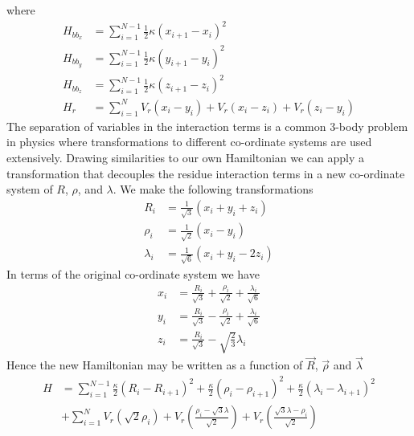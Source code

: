 %
where
%
\begin{align}
\label{col_hamiltonian_x}
H_{bb_x} &= \sum_{i=1}^{N-1} \frac{1}{2} \kappa \left(x_{i+1}-x_{i} \right)^2 \\
\label{col_hamiltonian_y}
H_{bb_y} &= \sum_{i=1}^{N-1} \frac{1}{2} \kappa \left(y_{i+1}-y_{i} \right)^2 \\
\label{col_hamiltonian_z}
H_{bb_z} &= \sum_{i=1}^{N-1} \frac{1}{2} \kappa \left(z_{i+1}-z_{i} \right)^2 \\
\label{col_hamiltonian_r}
H_{r} &= \sum_{i=1}^{N}V_{r}\left(x_{i}-y_{i}\right)+V_{r}\left(x_{i}-z_{i}\right)+V_{r}\left(z_{i}-y_{i}\right)
\end{align}
%
The separation of variables in the interaction terms is a common 3-body problem in physics where transformations to different co-ordinate systems are used extensively. Drawing similarities to our own Hamiltonian we can apply a transformation that decouples the residue interaction terms in a new co-ordinate system of $R$, $\rho$, and $\lambda$. We make the following transformations
%
\begin{align}
\label{col_trans}
R_{i}&=\frac{1}{\sqrt{3}}(x_{i}+y_{i}+z_{i})\\
\rho_{i}&=\frac{1}{\sqrt{2}}(x_{i}-y_{i})\\
\lambda_{i}&=\frac{1}{\sqrt{6}}(x_{i}+y_{i}-2z_{i})
\end{align}
%
In terms of the original co-ordinate system we have
%
\begin{align}
\label{col_x}
x_{i}&=\frac{R_{i}}{\sqrt{3}} + \frac{\rho_{i}}{\sqrt{2}} + \frac{\lambda_{i}}{\sqrt{6}}\\
\label{col_y}
y_{i}&=\frac{R_{i}}{\sqrt{3}} - \frac{\rho_{i}}{\sqrt{2}} + \frac{\lambda_{i}}{\sqrt{6}}\\
\label{col_z}
z_{i}&=\frac{R_{i}}{\sqrt{3}} - \sqrt{\frac{2}{3}}\lambda_{i}
\end{align}
%
Hence the new Hamiltonian may be written as a function of $\vec{R}$, $\vec{\rho}$ and $\vec{\lambda}$
%
\begin{equation}\label{col_ham_trans1}
\begin{split}
H &= \sum_{i=1}^{N-1} \frac{\kappa}{2}\left(R_i-R_{i+1}\right)^{2}+\frac{\kappa}{2}\left(\rho_i-\rho_{i+1}\right)^{2}+\frac{\kappa}{2}\left(\lambda_i-\lambda_{i+1}\right)^{2} \\ 
&+\sum_{i=1}^{N}V_{r}\left(\sqrt{2}\rho_i\right)+V_{r}\left(\frac{\rho_i-\sqrt{3}\lambda}{\sqrt{2}}\right)+V_{r}\left(\frac{\sqrt{3}\lambda-\rho_i}{\sqrt{2}}\right)
\end{split}
\end{equation}
%
